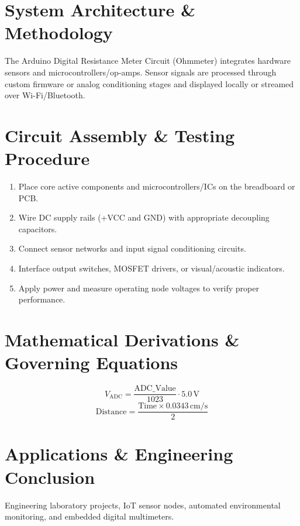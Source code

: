 \documentclass[11pt,a4paper]{article}
\begin{document}
\section{System Architecture \& Methodology}
The Arduino Digital Resistance Meter Circuit (Ohmmeter) integrates hardware sensors and microcontrollers/op-amps. Sensor signals are processed through custom firmware or analog conditioning stages and displayed locally or streamed over Wi-Fi/Bluetooth.

\section{Circuit Assembly \& Testing Procedure}
\begin{enumerate}
    \item Place core active components and microcontrollers/ICs on the breadboard or PCB.
    \item Wire DC supply rails (+VCC and GND) with appropriate decoupling capacitors.
    \item Connect sensor networks and input signal conditioning circuits.
    \item Interface output switches, MOSFET drivers, or visual/acoustic indicators.
    \item Apply power and measure operating node voltages to verify proper performance.
\end{enumerate}

\section{Mathematical Derivations \& Governing Equations}
\begin{equation}
V_{\text{ADC}} = \frac{\text{ADC\_Value}}{1023} \cdot 5.0\,\text{V}
\end{equation}
\begin{equation}
\text{Distance} = \frac{\text{Time} \times 0.0343\,\text{cm/s}}{2}
\end{equation}

\section{Applications \& Engineering Conclusion}
Engineering laboratory projects, IoT sensor nodes, automated environmental monitoring, and embedded digital multimeters.
\end{document}
